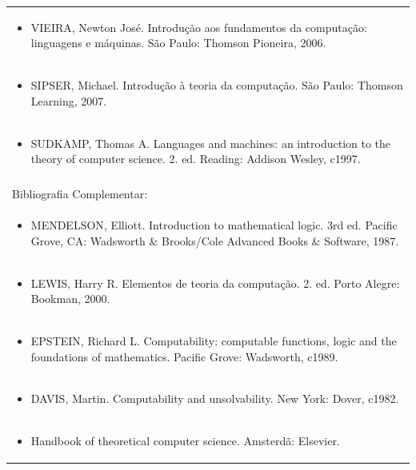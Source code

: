 \documentclass[11pt]{article}
\begin{document}
\begin{center}
\begin{longtable}{|p{4cm}|p{4cm}|p{4cm}|p{4cm}|}
\multicolumn{4}{|p{\dimexpr 16cm + 6\tabcolsep\relax}|}{\begin{itemize}\item VIEIRA, Newton José. Introdução aos fundamentos da computação: linguagens e máquinas. São Paulo: Thomson Pioneira, 2006.\end{itemize}}\\
\multicolumn{4}{|p{\dimexpr 16cm + 6\tabcolsep\relax}|}{\begin{itemize}\item SIPSER, Michael. Introdução à teoria da computação. São Paulo: Thomson Learning, 2007.\end{itemize}}\\
\multicolumn{4}{|p{\dimexpr 16cm + 6\tabcolsep\relax}|}{\begin{itemize}\item SUDKAMP, Thomas A. Languages and machines: an introduction to the theory of computer science. 2. ed. Reading: Addison Wesley, c1997.\end{itemize}}\\
\multicolumn{4}{|p{16cm}|}{}\\
\hline
\multicolumn{4}{|p{16cm}|}{Bibliografia Complementar:}\\*
\multicolumn{4}{|p{\dimexpr 16cm + 6\tabcolsep\relax}|}{\begin{itemize}\item MENDELSON, Elliott. Introduction to mathematical logic. 3rd ed. Pacific Grove, CA: Wadsworth \& Brooks/Cole Advanced Books \& Software, 1987.\end{itemize}}\\
\multicolumn{4}{|p{\dimexpr 16cm + 6\tabcolsep\relax}|}{\begin{itemize}\item LEWIS, Harry R. Elementos de teoria da computação. 2. ed. Porto Alegre: Bookman, 2000.\end{itemize}}\\
\multicolumn{4}{|p{\dimexpr 16cm + 6\tabcolsep\relax}|}{\begin{itemize}\item EPSTEIN, Richard L. Computability: computable functions, logic and the foundations of mathematics. Pacific Grove: Wadsworth, c1989.\end{itemize}}\\
\multicolumn{4}{|p{\dimexpr 16cm + 6\tabcolsep\relax}|}{\begin{itemize}\item DAVIS, Martin. Computability and unsolvability. New York: Dover, c1982.\end{itemize}}\\
\multicolumn{4}{|p{\dimexpr 16cm + 6\tabcolsep\relax}|}{\begin{itemize}\item Handbook of theoretical computer science. Amsterdã: Elsevier.\end{itemize}}\\
\hline
\end{longtable}
\end{center}
\end{document}
